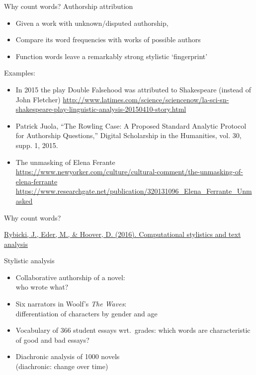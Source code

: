 \documentclass[aspectratio=169,usenames,dvipsnames]{beamer}
\begin{document}
\begin{frame}{Why count words?}
    Authorship attribution
    \begin{itemize}
        \item Given a work with unknown/disputed authorship,
        \item Compare its word frequencies with works of possible authors
        \item Function words leave a remarkably strong stylistic `fingerprint'
    \end{itemize}

    \pause
    Examples:
    \begin{itemize}
        \item In 2015 the play Double Falsehood was attributed to Shakespeare
                (instead of John Fletcher)
            \url{http://www.latimes.com/science/sciencenow/la-sci-sn-shakespeare-play-linguistic-analysis-20150410-story.html}

        \item Patrick Juola, ``The Rowling Case: A Proposed Standard Analytic Protocol for Authorship Questions,'' Digital Scholarship in the Humanities, vol. 30, supp. 1, 2015.
        \item The unmasking of Elena Ferante
            \url{https://www.newyorker.com/culture/cultural-comment/the-unmasking-of-elena-ferrante}
            \\
            {\small\url{https://www.researchgate.net/publication/320131096_Elena_Ferrante_Unmasked}}
    \end{itemize}
\end{frame}

\begin{frame}{Why count words?}
    \begin{reference}
    \href{http://www.infotext.unisi.it/upload/rybickihoovereder_with_figures.pdf}{Rybicki, J., Eder, M., \& Hoover, D. (2016). Computational stylistics and text analysis}
    \end{reference}
    Stylistic analysis
    \begin{itemize}
    \item Collaborative authorship of a novel:\\
        who wrote what?
    \item Six narrators in Woolf's \emph{The Waves}:\\
        differentiation of characters by gender and age
    \item Vocabulary of 366 student essays wrt.\ grades:
        which words are characteristic of good and bad essays?
    \item Diachronic analysis of 1000 novels \\
        (diachronic: change over time)
    \end{itemize}
\end{frame}
\end{document}
